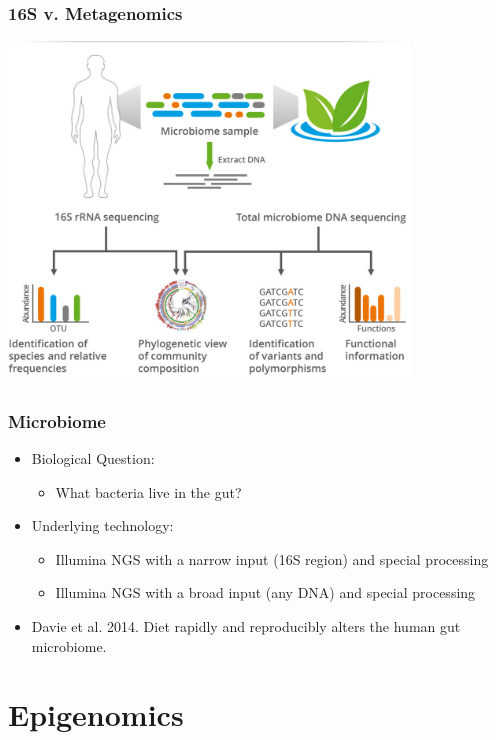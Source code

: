 \documentclass[14pt]{beamer}
\begin{document}
\begin{frame}
\frametitle{16S v. Metagenomics}
\centerline{\includegraphics[width=0.8\textwidth]{images_20170926_microbiome.png}}
\end{frame}

\begin{frame}
\frametitle{Microbiome}
\begin{itemize}
	\item<+-> Biological Question:
	\begin{itemize}
		\item<+-> What bacteria live in the gut? 
	\end{itemize}
	\item<+-> Underlying technology:
	\begin{itemize}
		\item<+-> Illumina NGS with a narrow input (16S region) and special processing
		\item<+-> Illumina NGS with a broad input (any DNA) and special processing
	\end{itemize}
	\item<+-> Davie et al. 2014. Diet rapidly and reproducibly alters the human gut microbiome.
\end{itemize}
\end{frame}



\section{Epigenomics}
\end{document}

